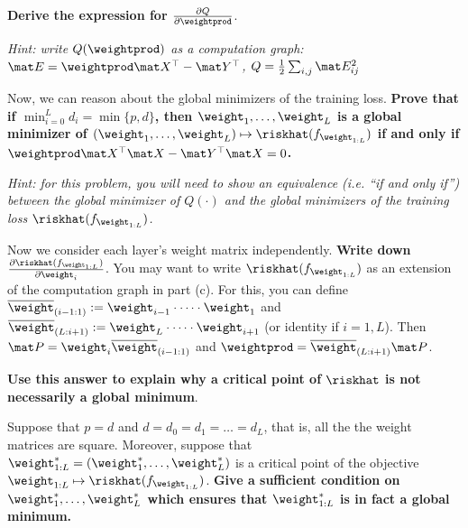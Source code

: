 \documentclass[preview]{standalone}
\begin{document}
\begin{Parts}
\textbf{Derive the expression for $\frac{\partial Q}{\partial \weightprod}$}.

\emph{Hint: write $Q(\weightprod)$ as a computation graph: $\mat E = \weightprod \mat X^\top -\mat Y^\top$, $Q = \frac{1}{2}\sum_{i,j}\mat E_{ij}^2$}




	\Part
	Now, we can reason about the global minimizers of the training loss.
	\textbf{Prove that if $\min_{i=0}^L d_i = \min\{p,d\}$, then $\weight_1,\dots,\weight_L$ is a global minimizer of $(\weight_1,\dots,\weight_L) \mapsto \riskhat(f_{\weight_{1:L}})$ if and only if $ \weightprod\mat X^\top\mat X - \mat Y^\top \mat X = 0$. }

	\emph{Hint: for this problem, you will need to show an equivalence (i.e. ``if and only if'') between the global minimizer of $Q(\cdot)$ and the global minimizers of the training loss $\riskhat(f_{\weight_{1:L}})$. }

	

	
	

\Part
Now we consider each layer's weight matrix independently. 
\textbf{Write down $\frac{\partial \riskhat(f_{\weight_{1:L}})}{\partial \weight_i}$}.
You may want to write $\riskhat(f_{\weight_{1:L}})$ as an extension of the computation graph in part (c). For this, you can define $\overline{\weight}_{(i-1:1)} := \weight_{i-1} \cdot \dots \cdot \weight_{1}$ and $\overline{\weight}_{(L:i+1)} := \weight_{L} \cdot \dots \cdot \weight_{i+1}$ (or identity if $i  = 1,L$). 
Then $\mat P = \weight_i\overline{\weight}_{(i-1:1)}$ and $\weightprod = \overline{\weight}_{(L:i+1)}\mat P $.


\textbf{Use this answer to explain why a critical point of $\riskhat$ is not necessarily a global minimum}.





\Part
Suppose that $p = d$ and $d = d_0 = d_1 = \dots = d_L$, that is, all the the weight matrices are square. Moreover, suppose that ${\weight}^*_{1:L} = ({\weight}^*_1,\dots,{\weight}^*_L)$ is a critical point of the objective $\weight_{1:L} \mapsto \riskhat(f_{\weight_{1:L}})$. \textbf{Give a sufficient condition on ${\weight}^*_1,\dots,{\weight}^*_L$ which ensures that ${\weight}^*_{1:L}$ is in fact a global minimum.}







\end{Parts}
\end{document}
